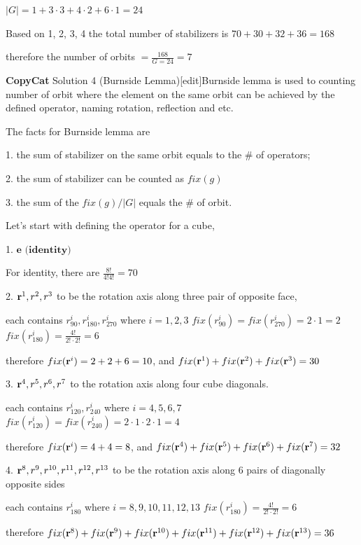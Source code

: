 \begin{enumerate}
 $|G| = 1 + 3\cdot3 + 4\cdot2 + 6\cdot1 = 24$

 Based on 1, 2, 3, 4 the total number of stabilizers is $70 + 30 + 32 + 36 = 168$

 therefore the number of orbits $= \frac{168}{G=24} = \boxed{7}$

 \textbf{CopyCat} Solution 4 (Burnside Lemma)[edit]Burnside lemma is used to counting number of orbit where the element on the same orbit can be achieved by the defined operator, naming rotation, reflection and etc.

 The facts for Burnside lemma are

 1. the sum of stabilizer on the same orbit equals to the \# of operators;

 2. the sum of stabilizer can be counted as $fix(g)$

 3. the sum of the $fix(g)/|G|$ equals the \# of orbit.

 
Let's start with defining the operator for a cube,

 1. $\textbf{e (identity)}$

 For identity, there are $\frac{8!}{4!4!} = 70$

 
2. ${\textbf r^{1}, r^{2}, r^{3}}$ to be the rotation axis along three pair of opposite face,

 each contains $r^{i}_{90}, r^{i}_{180}, r^{i}_{270}$ where $i= 1, 2, 3$
$fix(r^{i}_{90}) = fix(r^{i}_{270}) = 2\cdot1 = 2$
$fix(r^{i}_{180}) = \frac{4!}{2!\cdot2!} = 6$

 therefore $fix(\textbf r^{i}) = 2+2+6 = 10$, and $fix(\textbf r^{1})+fix(\textbf r^{2})+fix(\textbf r^{3}) = 30$

 
3. ${\textbf r^{4}, r^{5}, r^{6}, r^{7}}$ to the rotation axis along four cube diagonals.

 each contains $r^{i}_{120}, r^{i}_{240}$ where $i= 4, 5, 6, 7$
$fix(r^{i}_{120}) = fix(r^{i}_{240}) = 2\cdot1\cdot2\cdot1 = 4$

 therefore $fix(\textbf r^{i}) = 4+4 = 8$, and $fix(\textbf r^{4})+fix(\textbf r^{5})+fix(\textbf r^{6})+fix(\textbf r^{7}) = 32$

 


 4. ${\textbf r^{8}, r^{9}, r^{10}, r^{11}, r^{12}, r^{13}}$ to be the rotation axis along 6 pairs of diagonally opposite sides

 each contains $r^{i}_{180}$ where $i= 8, 9, 10, 11, 12, 13$
$fix(r^{i}_{180}) = \frac{4!}{2!\cdot2!} = 6$

 therefore $fix(\textbf r^{8})+fix(\textbf r^{9})+fix(\textbf r^{10})+fix(\textbf r^{11})+fix(\textbf r^{12})+fix(\textbf r^{13}) = 36$


\end{enumerate}
